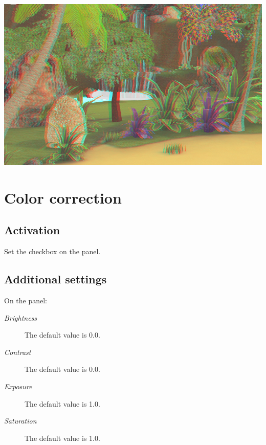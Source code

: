 \documentclass[a4paper,12pt,oneside]{sphinxmanual}
\begin{document}
{\hfill\includegraphics[width=1.000\linewidth]{anaglyph.jpg}\hfill}

\begin{DUlineblock}{0em}
\item[] 
\end{DUlineblock}


\section{Color correction}
\label{postprocessing_effects:index-6}\label{postprocessing_effects:id23}\label{postprocessing_effects:color-correction}

\subsection{Activation}
\label{postprocessing_effects:id24}
Set the  checkbox on the  panel.


\subsection{Additional settings}
\label{postprocessing_effects:id25}
On the  panel:
\begin{description}
\item[{\emph{Brightness}}] \leavevmode
The default value is 0.0.

\item[{\emph{Contrast}}] \leavevmode
The default value is 0.0.

\item[{\emph{Exposure}}] \leavevmode
The default value is 1.0.

\item[{\emph{Saturation}}] \leavevmode
The default value is 1.0.

\end{description}
\end{document}
